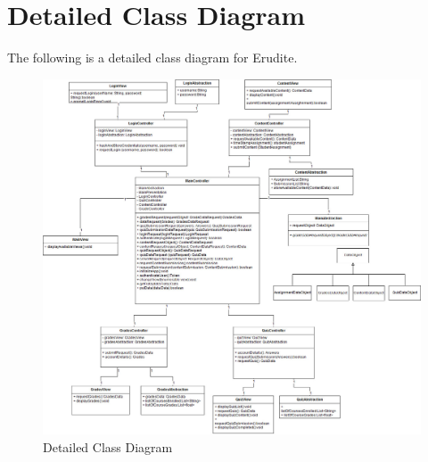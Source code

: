 \documentclass[]{article}
\begin{document}
\section{Detailed Class Diagram}
\label{sec:detailed_class_diagram}
The following is a detailed class diagram for Erudite.
\begin{figure}[H]
  \centering
  \includegraphics[scale=0.35]{A3_Assets/DetailedClassDiagram.jpg}
  \caption{Detailed Class Diagram}
\end{figure}


\newpage
\appendix
\end{document}
